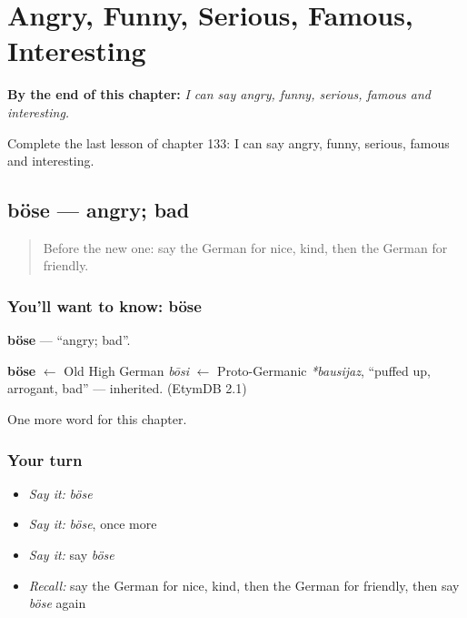 
\chapter{Angry, Funny, Serious, Famous, Interesting}
\label{ch:ge-angry-funny-serious-famous-interesting}

\begin{chapteropening}
\textbf{By the end of this chapter:} \emph{I can say angry, funny, serious, famous and interesting.}

Complete the last lesson of chapter 133: I can say angry, funny, serious, famous and interesting.
\end{chapteropening}

\section[böse]{böse — angry; bad}

\label{lesson:GE-C133-boese}



\begin{quote}
Before the new one: say the German for nice, kind, then the German for friendly.
\end{quote}

\subsection*{You'll want to know: böse}
\textbf{böse} — \textquotedblleft{}angry; bad\textquotedblright{}.

\begin{cousinweb}
\textbf{böse} $\leftarrow$ Old High German \emph{bōsi} $\leftarrow$ Proto-Germanic \emph{*bausijaz}, \textquotedblleft{}puffed up, arrogant, bad\textquotedblright{} — inherited. (EtymDB 2.1)
\end{cousinweb}

\begin{grammarlens}[title={What you've built}]
One more word for this chapter.
\end{grammarlens}

\subsection*{Your turn}
\begin{itemize}
\raggedright
  \item \emph{Say it:} \emph{böse}
  \item \emph{Say it:} \emph{böse}, once more
  \item \emph{Say it:} say \emph{böse}
  \item \emph{Recall:} say the German for nice, kind, then the German for friendly, then say \emph{böse} again
\end{itemize}

